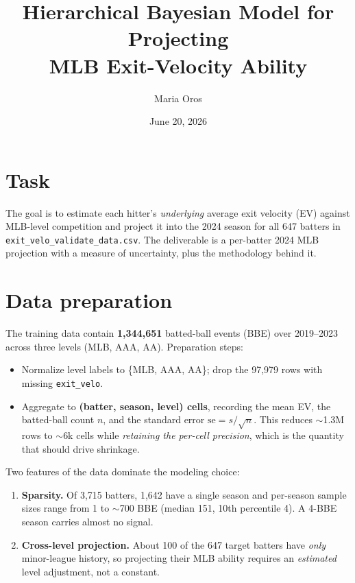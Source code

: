\documentclass[11pt]{article}
\title{\vspace{-1.5em}Hierarchical Bayesian Model for Projecting\\ MLB Exit-Velocity Ability}
\author{Maria Oros}
\date{June 20, 2026}
\begin{document}
\maketitle
\vspace{-1.2em}

\section{Task}
The goal is to estimate each hitter's \emph{underlying} average exit velocity (EV)
against MLB-level competition and project it into the 2024 season for all 647
batters in \texttt{exit\_velo\_validate\_data.csv}. The deliverable is a per-batter
2024 MLB projection with a measure of uncertainty, plus the methodology behind it.

\section{Data preparation}
The training data contain \textbf{1{,}344{,}651} batted-ball events (BBE) over
2019--2023 across three levels (MLB, AAA, AA). Preparation steps:
\begin{itemize}
  \item Normalize level labels to \{MLB, AAA, AA\}; drop the 97{,}979 rows with
        missing \texttt{exit\_velo}.
  \item Aggregate to \textbf{(batter, season, level) cells}, recording the mean EV,
        the batted-ball count $n$, and the standard error $\mathrm{se}=s/\sqrt{n}$.
        This reduces $\sim$1.3M rows to $\sim$6k cells while \emph{retaining the
        per-cell precision}, which is the quantity that should drive shrinkage.
\end{itemize}
Two features of the data dominate the modeling choice:
\begin{enumerate}
  \item \textbf{Sparsity.} Of 3{,}715 batters, 1{,}642 have a single season and
        per-season sample sizes range from 1 to $\sim$700 BBE
        (median 151, 10th percentile 4). A 4-BBE season carries almost no signal.
  \item \textbf{Cross-level projection.} About 100 of the 647 target batters have
        \emph{only} minor-league history, so projecting their MLB ability requires
        an \emph{estimated} level adjustment, not a constant.
\end{enumerate}
\end{document}
